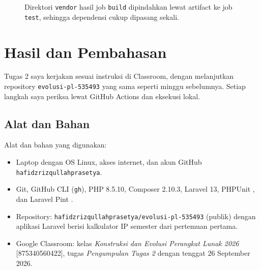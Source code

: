 \documentclass[a4paper,oneside,12pt]{report}
\newcommand{\tocboldsection}[1]{%
  \protect\renewcommand{\protect\cftchapfont}{\protect\bfseries}%
  #1%
  \protect\renewcommand{\protect\cftchapfont}{}%
}
\begin{document}
\begin{figure}[H]
    \centering
    \caption{Direktori \texttt{vendor} hasil job \texttt{build} dipindahkan lewat artifact ke job \texttt{test}, sehingga dependensi cukup dipasang sekali.}
    \label{fig:artifact-flow}
\end{figure}

\clearpage

\chapter[\tocboldsection{Hasil dan Pembahasan}]{Hasil dan Pembahasan}
Tugas 2 saya kerjakan sesuai instruksi di Classroom, dengan melanjutkan repository \texttt{evolusi-pl-535493} yang sama seperti minggu sebelumnya. Setiap langkah saya periksa lewat GitHub Actions dan eksekusi lokal.

\section{Alat dan Bahan}
Alat dan bahan yang digunakan:
\begin{itemize}
    \item Laptop dengan OS Linux, akses internet, dan akun GitHub \texttt{hafidzrizqullahprasetya}.
    \item Git, GitHub CLI (\texttt{gh}), PHP 8.5.10, Composer 2.10.3, Laravel 13, PHPUnit \cite{phpunit-docs}, dan Laravel Pint \cite{pint-docs}.
    \item Repository: \texttt{hafidzrizqullahprasetya/evolusi-pl-535493} (publik) dengan aplikasi Laravel berisi kalkulator IP semester dari pertemuan pertama.
    \item Google Classroom: kelas \textit{Konstruksi dan Evolusi Perangkat Lunak 2026} [875340560422], tugas \textit{Pengumpulan Tugas 2} dengan tenggat 26 September 2026.
\end{itemize}
\end{document}
